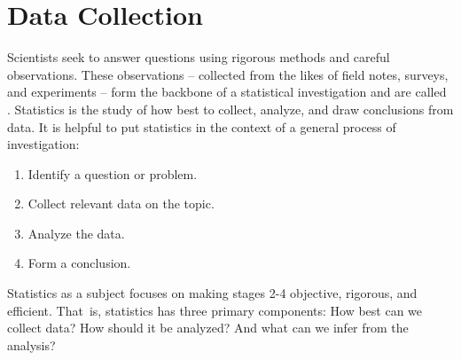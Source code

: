 \chapter{Data Collection}
\label{introductionToData}


Scientists seek to answer questions using rigorous methods and careful observations. These observations -- collected from the likes of field notes, surveys, and experiments -- form the backbone of a statistical investigation and are called . Statistics is the study of how best to collect, analyze, and draw conclusions from data. It is helpful to put statistics in the context of a general process of investigation:
\begin{enumerate}
\setlength{\itemsep}{0mm}
\item Identify a question or problem.
\item Collect relevant data on the topic.
\item Analyze the data.
\item Form a conclusion.
\end{enumerate}

Statistics as a subject focuses on making stages 2-4 objective, rigorous, and efficient. That~is, statistics has three primary components: How best can we collect data? How should it be analyzed? And what can we infer from the analysis?


